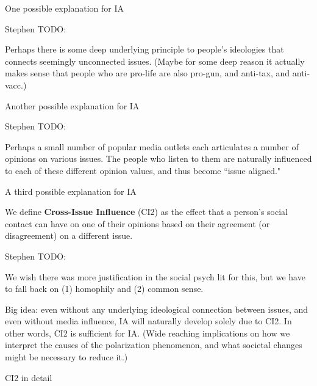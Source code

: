 \documentclass[12pt]{beamer}
\begin{document}
\begin{frame}[c]{One possible explanation for IA} %

{\tiny \color{red} 
Stephen TODO:

Perhaps there is some deep underlying principle to people's ideologies that
connects seemingly unconnected issues. (Maybe for some deep reason it actually
makes sense that people who are pro-life are also pro-gun, and anti-tax, and
anti-vacc.)
}

\end{frame}

\begin{frame}[c]{Another possible explanation for IA} %

{\tiny \color{red} 
Stephen TODO:

Perhaps a small number of popular media outlets each articulates a number of
opinions on various issues. The people who listen to them are naturally
influenced to each of these different opinion values, and thus become ``issue
aligned."
}

\end{frame}

\begin{frame}[c]{A third possible explanation for IA} %

We define \textbf{Cross-Issue Influence} (CI2) as the effect that a person's
social contact can have on one of their opinions based on their agreement (or
disagreement) on a different issue.

{\tiny \color{red} 
Stephen TODO:

We wish there was more justification in the social psych lit for this, but we
have to fall back on (1) homophily and (2) common sense.

Big idea: even without any underlying ideological connection between issues,
and even without media influence, IA will naturally develop solely due to CI2.
In other words, CI2 is sufficient for IA. (Wide reaching implications on how we
interpret the causes of the polarization phenomenon, and what societal changes
might be necessary to reduce it.)
}

\end{frame}

\begin{frame}[c]{CI2 in detail}  %

\end{frame}
\end{document}
